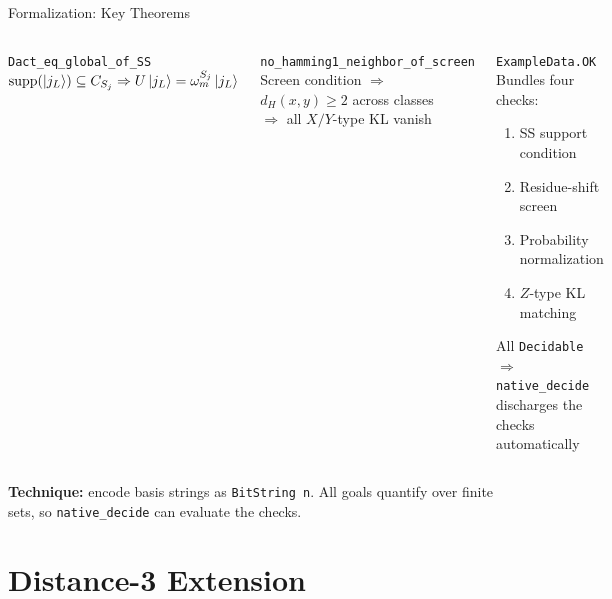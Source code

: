 \documentclass[aspectratio=169,t,10pt]{beamer}
\newcommand{\code}[1]{\texttt{\small #1}}
\begin{document}
\begin{frame}[fragile]{Formalization: Key Theorems}

\begin{columns}[T]
\begin{block}{\code{Dact\_eq\_global\_of\_SS}}
$\mathrm{supp}(\ket{j_L})\subseteq C_{S_j}
 \Rightarrow 
U\ket{j_L} = \omega_m^{S_j}\ket{j_L}$
\end{block}

\begin{block}{\code{no\_hamming1\_neighbor\_of\_screen}}
Screen condition $\Rightarrow$
$d_H(x,y)\geq 2$ across classes\\
$\Rightarrow$ all $X/Y$-type KL vanish
\end{block}

\begin{alertblock}{\code{ExampleData.OK}}
Bundles four checks:
\begin{enumerate}\setlength\itemsep{0pt}
\item SS support condition
\item Residue-shift screen
\item Probability normalization
\item $Z$-type KL matching
\end{enumerate}
All \code{Decidable} $\Rightarrow$\\
\code{native\_decide} discharges the checks automatically
\end{alertblock}
\end{columns}

\vspace{0.2em}
{\footnotesize
\textbf{Technique:} encode basis strings as \code{BitString n}. All goals quantify over finite sets,
so \code{native\_decide} can evaluate the checks.}
\end{frame}

\section{Distance-3 Extension}
\end{document}
